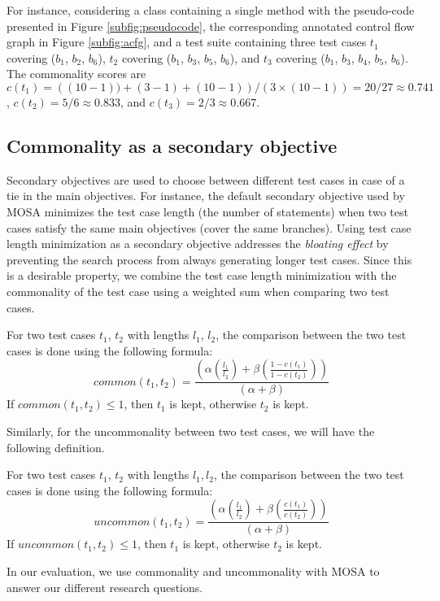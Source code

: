 For instance, considering a class containing a single method with the pseudo-code presented in Figure \ref{subfig:pseudocode}, the corresponding annotated control flow graph in Figure \ref{subfig:acfg}, and a test suite containing three test cases $t_1$ covering ($b_1$, $b_2$, $b_6$), $t_2$ covering ($b_1$, $b_3$, $b_5$, $b_6$), and $t_3$ covering ($b_1$, $b_3$, $b_4$, $b_5$, $b_6$). The commonality scores are  
$c(t_1) = \left( (10-1))+ (3-1) + (10-1) \right)/\left(3 \times (10 - 1)\right) = 20/27 \approx 0.741$, 
$c(t_2) = 5/6 \approx 0.833$, and 
$c(t_3) = 2/3 \approx 0.667$.


\subsection{Commonality as a secondary objective}

Secondary objectives are used to choose between different test cases in case of a tie in the main objectives. For instance, the default secondary objective used by MOSA \cite{Panichella2015} minimizes the test case length (\ie the number of statements) when two test cases satisfy the same main objectives (\eg cover the same branches). Using test case length minimization as a secondary objective addresses the \emph{bloating effect} \cite{Silva2012} by preventing the search process from always generating longer test cases. Since this is a desirable property, we combine the test case length minimization with the commonality of the test case using a weighted sum when comparing two test cases. 
%
\begin{definition}\label{def:common}
    For two test cases $t_1$, $t_2$ with lengths $l_1$, $l_2$, the comparison between the two test cases is done using the following formula: 
    $$\textit{common}(t_1,t_2) = \frac{\left( 
        \alpha \left( \frac{l_1}{l_2} \right) +
        \beta \left( \frac{1 - c(t_1)}{1 - c(t_2)} \right)
    \right)}{\left(\alpha + \beta \right)} $$
    If $\textit{common}(t_1,t_2) \leq 1$, then $t_1$ is kept, otherwise $t_2$ is kept. 
\end{definition}
%
Similarly, for the uncommonality between two test cases, we will have the following definition.
%
\begin{definition}\label{def:uncommon}
    For two test cases $t_1$, $t_2$ with lengths $l_1, l_2$, the comparison between the two test cases is done using the following formula: 
    $$\textit{uncommon}(t_1,t_2) = \frac{\left( 
        \alpha \left( \frac{l_1}{l_2} \right) +
        \beta \left( \frac{c(t_1)}{c(t_2)} \right)
    \right)}{\left(\alpha + \beta \right)} $$
    If $\textit{uncommon}(t_1,t_2) \leq 1$, then $t_1$ is kept, otherwise $t_2$ is kept. 
\end{definition}
%
In our evaluation, we use commonality and uncommonality with MOSA to answer our different research questions. 
